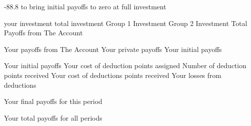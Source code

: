 -88.8 to bring initial payoffs to zero at full investment

your investment
total investment
Group 1 Investment
Group 2 Investment
Total Payoffs from The Account

Your payoffs from The Account
Your private payoffs
Your initial payoffs


Your initial payoffs
Your cost of deduction points assigned
Number of deduction points received
Your cost of deductions points received
Your losses from deductions

Your final payoffs for this period

Your total payoffs for all periods
